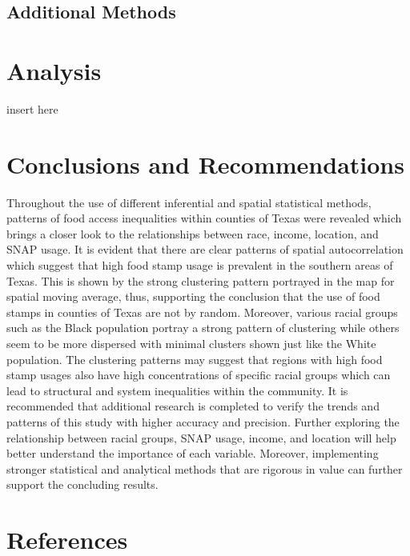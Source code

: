 \documentclass[]{article}
\begin{document}
\subsection{Additional Methods}\label{additional-methods}

\section{Analysis}\label{analysis}

insert here

\section{Conclusions and
Recommendations}\label{conclusions-and-recommendations}

Throughout the use of different inferential and spatial statistical
methods, patterns of food access inequalities within counties of Texas
were revealed which brings a closer look to the relationships between
race, income, location, and SNAP usage. It is evident that there are
clear patterns of spatial autocorrelation which suggest that high food
stamp usage is prevalent in the southern areas of Texas. This is shown
by the strong clustering pattern portrayed in the map for spatial moving
average, thus, supporting the conclusion that the use of food stamps in
counties of Texas are not by random. Moreover, various racial groups
such as the Black population portray a strong pattern of clustering
while others seem to be more dispersed with minimal clusters shown just
like the White population. The clustering patterns may suggest that
regions with high food stamp usages also have high concentrations of
specific racial groups which can lead to structural and system
inequalities within the community. It is recommended that additional
research is completed to verify the trends and patterns of this study
with higher accuracy and precision. Further exploring the relationship
between racial groups, SNAP usage, income, and location will help better
understand the importance of each variable. Moreover, implementing
stronger statistical and analytical methods that are rigorous in value
can further support the concluding results.

\section{References}\label{references}
\end{document}
